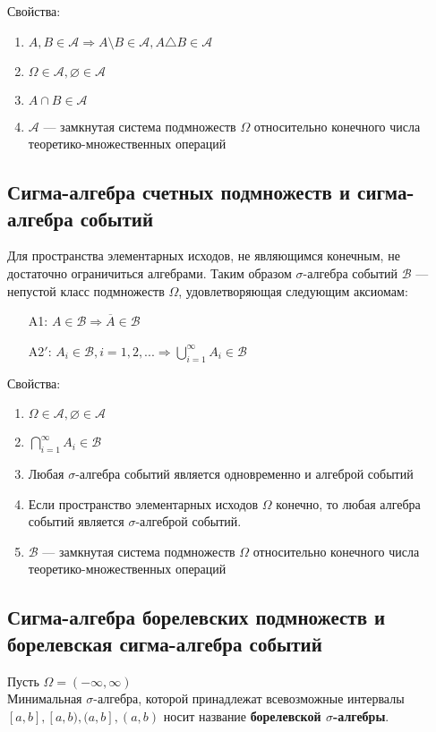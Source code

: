 \documentclass[12pt]{article}
\begin{document}
Свойства:
\begin{enumerate}
	\item $A,B \in \mathcal{A} \Rightarrow A \setminus B \in \mathcal{A}, A \triangle B \in \mathcal{A}$
	\item $\Omega \in \mathcal{A}, \varnothing \in \mathcal{A}$
	\item $A \cap B \in \mathcal{A}$
	\item $\mathcal{A}$ --- замкнутая система подмножеств $\Omega$ относительно конечного числа теоретико-множественных операций
\end{enumerate}

\subsection{Сигма-алгебра счетных подмножеств и сигма-алгебра событий}
Для пространства элементарных исходов, не являющимся конечным, не достаточно ограничиться алгебрами.
Таким образом $\sigma$-алгебра событий $\mathcal{B}$ --- непустой класс подмножеств $\Omega$, удовлетворяющая следующим аксиомам:
\begin{itemize}
	\item[A1:] $A \in \mathcal{B} \Rightarrow \overline{A} \in \mathcal{B}$
	\item[A2$'$:] $A_i \in \mathcal{B}, i = 1,2,... \Rightarrow \bigcup^{\infty}_{i = 1}A_i \in \mathcal{B}$
\end{itemize}

Свойства:
\begin{enumerate}
	\item $\Omega \in \mathcal{A}, \varnothing \in \mathcal{A}$
	\item $\bigcap^{\infty}_{i=1}A_i \in \mathcal{B}$
	\item Любая $\sigma$-алгебра событий является одновременно и алгеброй событий
	\item Если пространство элементарных исходов $\Omega$ конечно,
	      то любая алгебра событий является $\sigma$-алгеброй событий.
	\item $\mathcal{B}$ --- замкнутая система подмножеств $\Omega$ относительно конечного числа теоретико-множественных операций
\end{enumerate}

\subsection{Сигма-алгебра борелевских подмножеств и борелевская сигма-алгебра событий}
Пусть $\Omega = (-\infty, \infty)$ \\
Минимальная $\sigma$-алгебра, которой принадлежат всевозможные интервалы $[a, b], [a, b), (a, b], (a, b)$
носит название \textbf{борелевской $\sigma$-алгебры}.
\end{document}
